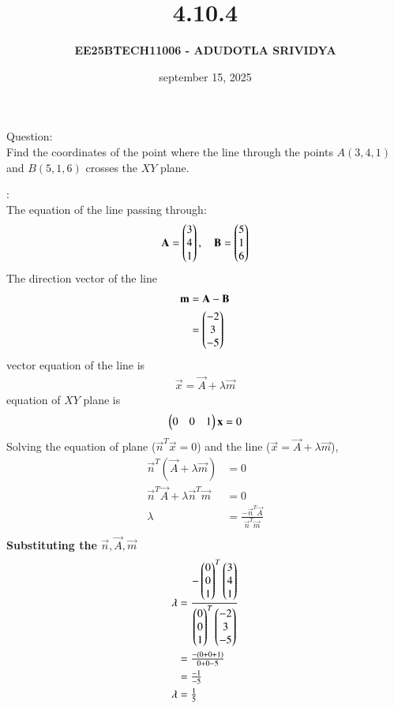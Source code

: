 \documentclass[journal]{IEEEtran}
\title{\textbf{4.10.4}}
\author{\textbf{EE25BTECH11006 - ADUDOTLA SRIVIDYA}}
\date{september 15, 2025}
\begin{document}
\maketitle

Question:\\
Find the coordinates of the point where the line through the points $A(3,4,1)$ and $B(5,1,6)$ crosses the $XY$ plane.

\solution:\\
The equation of the line passing through:
\begin{align}
    \mathbf{A} = \begin{pmatrix} 3 \\ 4 \\ 1\end{pmatrix}, \quad
    \mathbf{B} = \begin{pmatrix}5 \\ 1 \\ 6\end{pmatrix}
\end{align}
The direction vector of the line 
\begin{align}
    \mathbf{m} &= \mathbf{A} - \mathbf{B} \\
    &= \begin{pmatrix}-2 \\ 3 \\ -5\end{pmatrix}
\end{align}
vector equation of the line is
\begin{align}
    \vec{x} = \vec{A}+\lambda\vec{m}
\end{align}
equation of $XY$ plane is
\begin{align}
    \begin{pmatrix}0 & 0 & 1\end{pmatrix}\mathbf{x} = 0
\end{align}
Solving the equation of plane ($\vec{n}^{T}\vec{x}=0$) and the line ($\vec{x}=\vec{A}+\lambda\vec{m}$),
\begin{align}
    \vec{n}^{T}(\vec{A}+\lambda\vec{m})&=0\\
\vec{n}^{T}\vec{A}+\lambda\vec{n}^{T}\vec{m}&=0\\
\lambda&=\tfrac{-\vec{n}^{T}\vec{A}}{\vec{n}^{T}\vec{m}}\\
\end{align}
\newpage
\textbf{Substituting the $\vec{n},\vec{A},\vec{m}$}
\begin{align}
\lambda&=\dfrac{-\begin{pmatrix}0\\0 \\1\end{pmatrix}^{T}\begin{pmatrix}3\\4\\1\end{pmatrix}}{\begin{pmatrix}0\\0 \\1\end{pmatrix}^{T}\begin{pmatrix}-2\\3\\-5\end{pmatrix}}\\
&=\tfrac{-(0+0+1)}{0+0-5}\\
&=\tfrac{-1}{-5}\\
\lambda&=\tfrac{1}{5}
\end{align}
\end{document}
